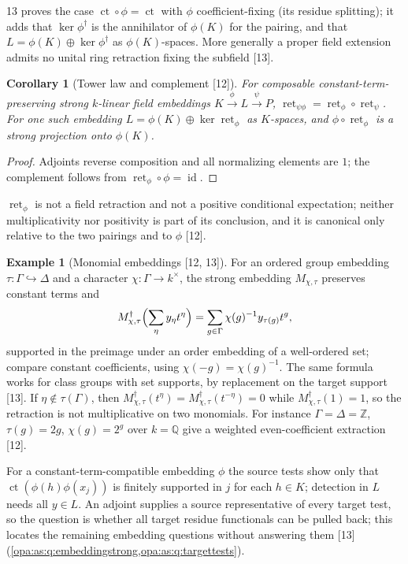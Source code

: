 \documentclass[11pt,oneside]{article}
\numberwithin{equation}{section}
\newtheorem{corollary}[corollary]{Corollary}
\theoremstyle{definition}
\newtheorem{example}[example]{Example}
\theoremstyle{remark}
\newcommand{\Q}{\mathbb Q}
\newcommand{\Z}{\mathbb Z}
\newcommand{\ct}{\operatorname{ct}}
\newcommand{\id}{\operatorname{id}}
\newcommand{\src}[1]{\textup{\textsf{\small[#1]}}}
\newcommand{\ret}{\operatorname{ret}}
\begin{document}
13 proves the case $\ct\circ\phi=\ct$ with $\phi$ coefficient-fixing (its residue splitting);
it adds that $\ker\phi^\dagger$ is the annihilator of $\phi(K)$ for the pairing, and that
$L=\phi(K)\oplus\ker\phi^\dagger$ as $\phi(K)$-spaces. More generally a proper field extension
admits no unital ring retraction fixing the subfield \src{13}.

\begin{corollary}[Tower law and complement \src{12}]\label{opa:as:cor:tower}
For composable constant-term-preserving strong $k$-linear field embeddings
$K\xrightarrow{\phi}L\xrightarrow{\psi}P$, $\ret_{\psi\phi}=\ret_\phi\circ\ret_\psi$. For one such
embedding $L=\phi(K)\oplus\ker\ret_\phi$ as $K$-spaces, and $\phi\circ\ret_\phi$ is a strong
projection onto $\phi(K)$.
\end{corollary}
\begin{proof}
Adjoints reverse composition and all normalizing elements are $1$; the complement follows from
$\ret_\phi\circ\phi=\id$.
\end{proof}

$\ret_\phi$ is not a field retraction and not a positive conditional expectation; neither
multiplicativity nor positivity is part of its conclusion, and it is canonical only relative to
the two pairings and to $\phi$ \src{12}.

\begin{example}[Monomial embeddings \src{12, 13}]\label{opa:as:ex:monomialadjoint}
For an ordered group embedding $\tau:\Gamma\hookrightarrow\Delta$ and a character
$\chi:\Gamma\to k^\times$, the strong embedding $M_{\chi,\tau}$ preserves constant terms and
\[
 M_{\chi,\tau}^\dagger\Bigl(\sum_\eta y_\eta t^\eta\Bigr)=\sum_{g\in\Gamma}\chi(g)^{-1}y_{\tau(g)}t^g,
\]
supported in the preimage under an order embedding of a well-ordered set; compare constant
coefficients, using $\chi(-g)=\chi(g)^{-1}$. The same formula works for class groups with set
supports, by replacement on the target support \src{13}. If $\eta\notin\tau(\Gamma)$, then
$M_{\chi,\tau}^\dagger(t^\eta)=M_{\chi,\tau}^\dagger(t^{-\eta})=0$ while $M_{\chi,\tau}^\dagger(1)=1$, so
the retraction is not multiplicative on two monomials. For instance $\Gamma=\Delta=\Z$,
$\tau(g)=2g$, $\chi(g)=2^g$ over $k=\Q$ give a weighted even-coefficient extraction \src{12}.
\end{example}

For a constant-term-compatible embedding $\phi$ the source tests show only that
$\ct(\phi(h)\phi(x_j))$ is finitely supported in $j$ for each $h\in K$; detection in $L$ needs
all $y\in L$. An adjoint supplies a source representative of every target test, so the
question is whether all target residue functionals can be pulled back; this locates the
remaining embedding questions without answering them \src{13}
(\cref{opa:as:q:embeddingstrong,opa:as:q:targettests}).
\end{document}
